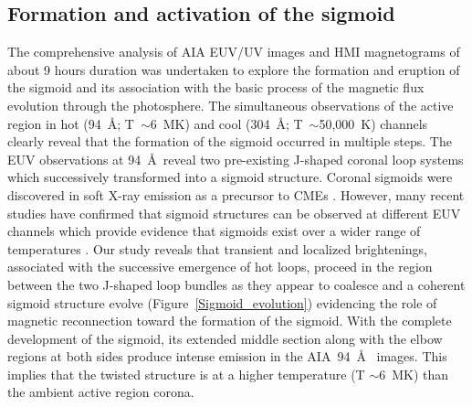 \documentclass[twocolumn]{aastex6}
\begin{document}
{\subsection{Formation and activation of the sigmoid}

The comprehensive analysis of AIA EUV/UV images and HMI magnetograms of about 9 hours duration was undertaken to explore the formation and eruption of the sigmoid and its association with the basic process of the magnetic flux evolution through the photosphere. The simultaneous observations of the active region in hot (94~\AA; T~$\sim$6~MK) and cool (304~\AA; T~$\sim$50,000~K) channels clearly reveal that the formation of the sigmoid occurred in multiple steps. The EUV observations at 94~\AA~reveal two pre-existing J-shaped coronal loop systems which successively transformed into a sigmoid structure. Coronal sigmoids were discovered in soft X-ray emission as a precursor to CMEs \citep{Rust1996, Manoharan1996}. However, many recent studies have confirmed that sigmoid structures can be observed at different EUV channels which provide evidence that sigmoids exist over a wider range of temperatures \citep{Liu2007,Cheng2014_double_MFR}. Our study reveals that transient and localized brightenings, associated with the successive emergence of hot loops, proceed in the region between the two J-shaped loop bundles as they appear to coalesce and a coherent sigmoid structure evolve (Figure~\ref{Sigmoid_evolution}) evidencing the role of magnetic reconnection toward the formation of the sigmoid. With the complete development of the sigmoid, its extended middle section along with the elbow regions at both sides produce intense emission in the AIA~94~\AA~ images. This implies that the twisted structure is at a higher temperature (T $\sim$6~MK) than the ambient active region corona.     

}
\end{document}
